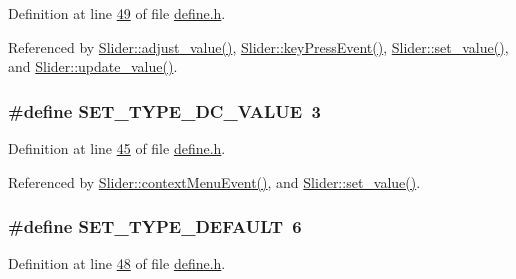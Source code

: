 Definition at line \hyperlink{a00090_source_l00049}{49} of file \hyperlink{a00090_source}{define.\+h}.



Referenced by \hyperlink{a00133_source_l00069}{Slider\+::adjust\+\_\+value()}, \hyperlink{a00133_source_l00219}{Slider\+::key\+Press\+Event()}, \hyperlink{a00133_source_l00102}{Slider\+::set\+\_\+value()}, and \hyperlink{a00133_source_l00088}{Slider\+::update\+\_\+value()}.

\hypertarget{a00090_a347f6ec80828b93988d22989c0df015f}{
\subsubsection[{S\+E\+T\+\_\+\+T\+Y\+P\+E\+\_\+\+D\+C\+\_\+\+V\+A\+L\+U\+E}]{\setlength{\rightskip}{0pt plus 5cm}\#define S\+E\+T\+\_\+\+T\+Y\+P\+E\+\_\+\+D\+C\+\_\+\+V\+A\+L\+U\+E~3}}\label{a00090_a347f6ec80828b93988d22989c0df015f}


Definition at line \hyperlink{a00090_source_l00045}{45} of file \hyperlink{a00090_source}{define.\+h}.



Referenced by \hyperlink{a00133_source_l00309}{Slider\+::context\+Menu\+Event()}, and \hyperlink{a00133_source_l00102}{Slider\+::set\+\_\+value()}.

\hypertarget{a00090_afd1036bf6329d2ac31913e14c1f56725}{
\subsubsection[{S\+E\+T\+\_\+\+T\+Y\+P\+E\+\_\+\+D\+E\+F\+A\+U\+L\+T}]{\setlength{\rightskip}{0pt plus 5cm}\#define S\+E\+T\+\_\+\+T\+Y\+P\+E\+\_\+\+D\+E\+F\+A\+U\+L\+T~6}}\label{a00090_afd1036bf6329d2ac31913e14c1f56725}


Definition at line \hyperlink{a00090_source_l00048}{48} of file \hyperlink{a00090_source}{define.\+h}.



